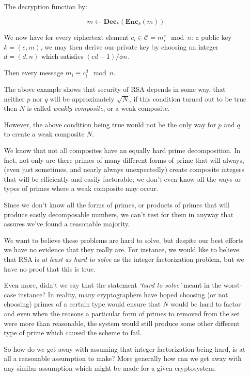 The decryption function by: 
  
  \[ m \leftarrow \mathbf{Dec}_{k}(\mathbf{Enc}_{k}(m)) \]
  

We now have for every ciphertext element $c_{i} \in \mathcal{C} = m_{i}^{e} \mod{n}$: a public key $k = (e, m)$, we may then derive our private key by choosing an integer $d = (d,n)$ which satisfies $(ed-1)/ \phi{n}$. 
  
Then every message $m_{i} \equiv c_{i}^{d} \mod{n}.$
  
  

The above example shows that security of RSA depends in some way, that neither $p$ nor $q$ will be approximately $\sqrt{N}$, if this condition turned out to be true then $N$ is called \emph{weakly composite}, or a weak composite. 

However, the above condition being true would not be the only way for $p$ and $q$ to create a weak composite $N$. 


We know that not all composites have an equally hard prime decomposition. In fact, not only are there primes of many different forms of prime that will always, (even just sometimes, and nearly always unexpectedly) create composite integers that will be efficiently and easily factorable; we don't even know all the ways or types of primes where a weak composite may occur. 

Since we don't know all the forms of primes, or products of primes that will produce easily decomposable numbers, we can't  test for them in anyway that assures we've found a reasonable majority. 

We want to believe these problems are hard to solve, but despite our best efforts we have no evidence that they really are. For instance, we would like to believe that RSA is \emph{at least as hard to solve} as the integer factorization problem, but we have no proof that this is true.


Even more, didn't we say that the statement \emph{`hard to solve'} meant in the worst-case instance? In reality, many cryptographers have hoped choosing (or not choosing) primes of a certain type would ensure that $N$ would be hard to factor and even when the reasons a particular form of primes to removed from the set were more than reasonable, the system would still produce some other different type of prime which caused the scheme to fail.

So how do we get away with assuming that integer factorization being hard, is at all a reasonable assumption to make? More generally how can we get away with any similar assumption which might be made for a given cryptosystem.


